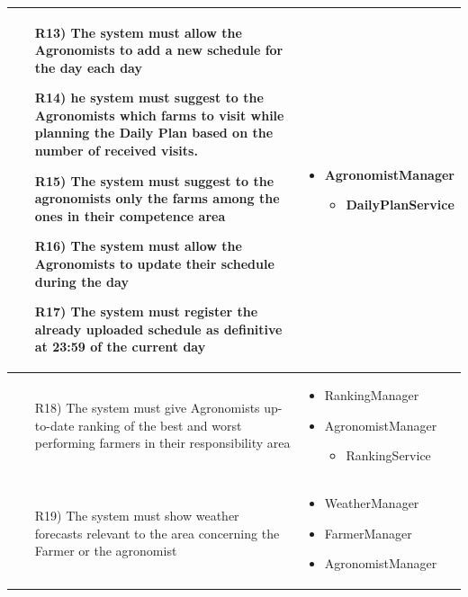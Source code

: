 \documentclass[table, 12pt]{article}
\begin{document}
\begin{longtable}{|p{}|p{}|}
    \begin{itemize}
        \item[R13)] The system must allow the Agronomists to add a new schedule for the day each day
        \item[R14)] he system must suggest to the Agronomists which farms to visit while planning the Daily Plan based on the number of received visits.
        \item[R15)] The system must suggest to the agronomists only the farms among the ones in their competence area  
        \item[R16)] The system must allow the Agronomists to update their schedule during the day
        \item[R17)] The system must register the already uploaded schedule as definitive at 23:59 of the current day  
    \end{itemize}

    &
    \begin{itemize}
        \item AgronomistManager \begin{itemize}
            \item DailyPlanService
        \end{itemize}
    \end{itemize}
    \\\hline

    \begin{itemize}
        \item[R18)] The system must give Agronomists up-to-date ranking of the best and worst performing farmers in their responsibility area 
    \end{itemize}
    &
    \begin{itemize}
        \item RankingManager 
        \item AgronomistManager
        \begin{itemize}
            \item RankingService
        \end{itemize}
    \end{itemize}
    \\\hline

    \begin{itemize}
        \item[R19)] The system must show weather forecasts relevant to the area concerning the Farmer or the agronomist
    \end{itemize}
    &
    \begin{itemize}
        \item WeatherManager
        \item FarmerManager
        \item AgronomistManager
    \end{itemize}
    \\\hline


\end{longtable}
\end{document}
